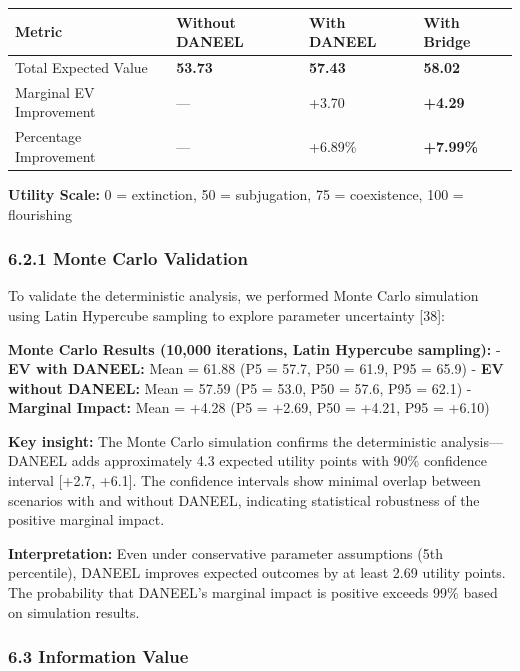 \documentclass[
]{article}
\begin{document}
\begin{longtable}[]{@{}llll@{}}
\toprule\noalign{}
Metric & Without DANEEL & With DANEEL & With Bridge \\
\midrule\noalign{}
\endhead
\bottomrule\noalign{}
\endlastfoot
Total Expected Value & \textbf{53.73} & \textbf{57.43} &
\textbf{58.02} \\
Marginal EV Improvement & --- & +3.70 & \textbf{+4.29} \\
Percentage Improvement & --- & +6.89\% & \textbf{+7.99\%} \\
\end{longtable}

\textbf{Utility Scale:} 0 = extinction, 50 = subjugation, 75 =
coexistence, 100 = flourishing

\hypertarget{monte-carlo-validation}{%
\subsubsection{6.2.1 Monte Carlo
Validation}\label{monte-carlo-validation}}

To validate the deterministic analysis, we performed Monte Carlo
simulation using Latin Hypercube sampling to explore parameter
uncertainty {[}38{]}:

\textbf{Monte Carlo Results (10,000 iterations, Latin Hypercube
sampling):} - \textbf{EV with DANEEL:} Mean = 61.88 (P5 = 57.7, P50 =
61.9, P95 = 65.9) - \textbf{EV without DANEEL:} Mean = 57.59 (P5 = 53.0,
P50 = 57.6, P95 = 62.1) - \textbf{Marginal Impact:} Mean = +4.28 (P5 =
+2.69, P50 = +4.21, P95 = +6.10)

\textbf{Key insight:} The Monte Carlo simulation confirms the
deterministic analysis---DANEEL adds approximately 4.3 expected utility
points with 90\% confidence interval {[}+2.7, +6.1{]}. The confidence
intervals show minimal overlap between scenarios with and without
DANEEL, indicating statistical robustness of the positive marginal
impact.

\textbf{Interpretation:} Even under conservative parameter assumptions
(5th percentile), DANEEL improves expected outcomes by at least 2.69
utility points. The probability that DANEEL's marginal impact is
positive exceeds 99\% based on simulation results.

\hypertarget{information-value}{%
\subsubsection{6.3 Information Value}\label{information-value}}
\end{document}
